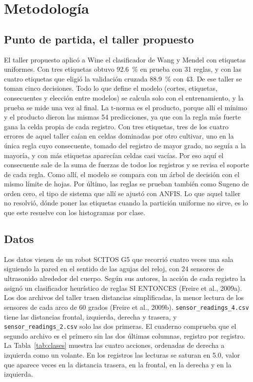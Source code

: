 \documentclass[11pt,letterpaper]{article}
\begin{document}
\section{Metodología}

\subsection{Punto de partida, el taller propuesto}

El taller propuesto aplicó a Wine el clasificador de Wang y Mendel con etiquetas uniformes. Con tres etiquetas obtuvo 92.6~\% en prueba con 31 reglas, y con las cuatro etiquetas que eligió la validación cruzada 88.9~\% con 43. De ese taller se toman cinco decisiones. Todo lo que define el modelo (cortes, etiquetas, consecuentes y elección entre modelos) se calcula solo con el entrenamiento, y la prueba se mide una vez al final. La t-norma es el producto, porque allí el mínimo y el producto dieron las mismas 54 predicciones, ya que con la regla más fuerte gana la celda propia de cada registro. Con tres etiquetas, tres de los cuatro errores de aquel taller caían en celdas dominadas por otro cultivar, uno en la única regla cuyo consecuente, tomado del registro de mayor grado, no seguía a la mayoría, y con más etiquetas aparecían celdas casi vacías. Por eso aquí el consecuente sale de la suma de fuerzas de todos los registros y se revisa el soporte de cada regla. Como allí, el modelo se compara con un árbol de decisión con el mismo límite de hojas. Por último, las reglas se prueban también como Sugeno de orden cero, el tipo de sistema que allí se ajustó con ANFIS. Lo que aquel taller no resolvió, dónde poner las etiquetas cuando la partición uniforme no sirve, es lo que este resuelve con los histogramas por clase.

\subsection{Datos}

Los datos vienen de un robot SCITOS G5 que recorrió cuatro veces una sala siguiendo la pared en el sentido de las agujas del reloj, con 24 sensores de ultrasonido alrededor del cuerpo. Según sus autores, la acción de cada registro la asignó un clasificador heurístico de reglas SI ENTONCES (Freire et al., 2009a). Los dos archivos del taller traen distancias simplificadas, la menor lectura de los sensores de cada arco de 60 grados (Freire et al., 2009b). \texttt{sensor\_readings\_4.csv} tiene las distancias frontal, izquierda, derecha y trasera, y \texttt{sensor\_readings\_2.csv} solo las dos primeras. El cuaderno comprueba que el segundo archivo es el primero sin las dos últimas columnas, registro por registro. La Tabla~\ref{tab:clases} muestra las cuatro acciones, ordenadas de derecha a izquierda como un volante. En los \nReg{} registros las lecturas se saturan en 5.0, valor que aparece \satD{} veces en la distancia trasera, \satA{} en la frontal, \satC{} en la derecha y \satB{} en la izquierda.
\end{document}
